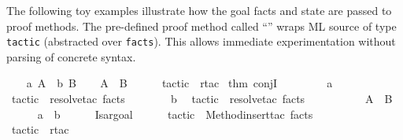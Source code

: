 \begin{isabellebody}
\begin{isamarkuptext}
  \medskip The following toy examples illustrate how the goal facts
  and state are passed to proof methods.  The pre-defined proof method
  called ``\hyperlink{method.tactic}{\mbox{}}'' wraps ML source of type \verb|tactic| (abstracted over \verb|facts|).  This allows immediate
  experimentation without parsing of concrete syntax.%
\end{isamarkuptext}%
\isamarkuptrue%
%
\endisatagmlex
{\isafoldmlex}%
%
\isadelimmlex
%
\endisadelimmlex
{}\isamarkupfalse%
\isanewline
%
\isadelimproof
\ \ %
\endisadelimproof
%
\isatagproof
{}\isamarkupfalse%
\ a{\isacharcolon}\ A\ \ b{\isacharcolon}\ B\isanewline
\isanewline
\ \ \isamarkupfalse%
\ {\isachardoublequoteopen}A\ {\isasymand}\ B{\isachardoublequoteclose}\isanewline
\ \ \ \ \isamarkupfalse%
\ {\isacharparenleft}tactic\ {\isacharverbatimopen}\ rtac\ %
\isaantiq
thm\ conjI%
\endisaantiq
\ {}\ {\isacharverbatimclose}{\isacharparenright}\isanewline
\ \ \ \ \isamarkupfalse%
\ a\ \isamarkupfalse%
\ {\isacharparenleft}tactic\ {\isacharverbatimopen}\ resolve{\isacharunderscore}tac\ facts\ {}\ {\isacharverbatimclose}{\isacharparenright}\isanewline
\ \ \ \ \isamarkupfalse%
\ b\ \isamarkupfalse%
\ {\isacharparenleft}tactic\ {\isacharverbatimopen}\ resolve{\isacharunderscore}tac\ facts\ {}\ {\isacharverbatimclose}{\isacharparenright}\isanewline
\ \ \ \ \isamarkupfalse%
\isanewline
\isanewline
\ \ \isamarkupfalse%
\ {\isachardoublequoteopen}A\ {\isasymand}\ B{\isachardoublequoteclose}\isanewline
\ \ \ \ \isamarkupfalse%
\ a\ \ b%
\endisatagproof
{\isafoldproof}%
%
\isadelimproof
\isanewline
%
\endisadelimproof
%
\isadelimML
\ \ \ \ %
\endisadelimML
%
\isatagML
{}\isamarkupfalse%
\ {\isachardoublequoteopen}{\isacharat}{\isacharbraceleft}Isar{\isachardot}goal{\isacharbraceright}{\isachardoublequoteclose}%
\endisatagML
{\isafoldML}%
%
\isadelimML
\isanewline
%
\endisadelimML
%
\isadelimproof
\ \ \ \ %
\endisadelimproof
%
\isatagproof
{}\isamarkupfalse%
\ {\isacharparenleft}tactic\ {\isacharverbatimopen}\ Method{\isachardot}insert{\isacharunderscore}tac\ facts\ {}\ {\isacharverbatimclose}{\isacharparenright}\isanewline
\ \ \ \ \isamarkupfalse%
\ {\isacharparenleft}tactic\ {\isacharverbatimopen}\ {\isacharparenleft}rtac\ %

\end{isabellebody}
